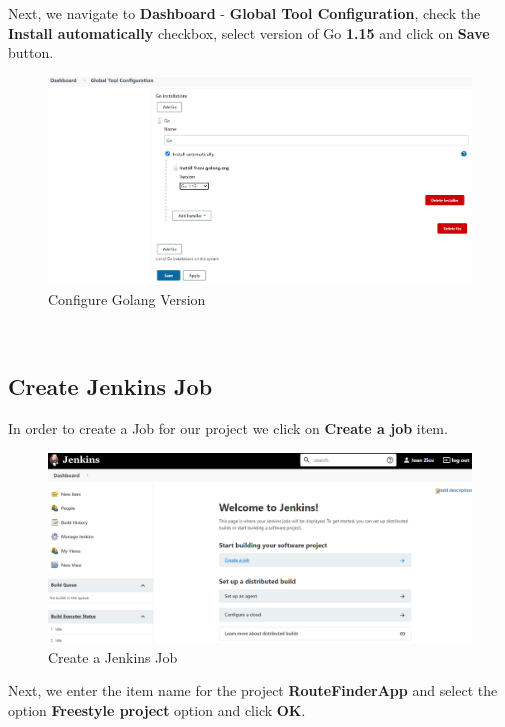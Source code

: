 \documentclass[12pt,a4paper,twoside]{article}
\begin{document}
Next, we navigate to \textbf{Dashboard} - \textbf{Global Tool Configuration}, check the \textbf{Install automatically} checkbox, select version of Go \textbf{1.15} and click on \textbf{Save} button.


\begin{figure}[h!]
    \centering
        \includegraphics[width=15cm]{images-aws/31-go-global-tool.png}
        \caption{Configure Golang Version}
\end{figure}



~\newpage


\subsection{Create Jenkins Job}


In order to create a Job for our project we click on 
\textbf{Create a job} item.


\begin{figure}[H]
    \centering
        \includegraphics[width=15cm]{images-aws/32-jenkins-create-job.png}
        \caption{Create a Jenkins Job}
\end{figure}


Next, we enter the item name for the project \textbf{RouteFinderApp} and select the option \textbf{Freestyle project} option and click \textbf{OK}.
\end{document}
